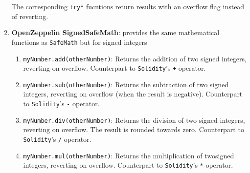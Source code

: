 \begin{enumerate}
	The corresponding \verb|try*| fucntions return results with an overflow flag instead of reverting.

\item\textbf{OpenZeppelin SignedSafeMath}: provides the same mathematical functions as \verb|SafeMath| but for signed integers
	\begin{enumerate}
	\item\verb|myNumber.add(otherNumber)|: Returns the addition of two signed integers, reverting on overflow. Counterpart to \verb|Solidity|'s \verb|+| operator.
	\item\verb|myNumber.sub(otherNumber)|: Returns the subtraction of two signed integers, reverting on overflow (when the result is negative). Counterpart to \verb|Solidity|'s \verb|-| operator.
	\item\verb|myNumber.div(otherNumber)|: Returns the division of two signed integers, reverting on overflow. The result is rounded towards zero. Counterpart to \verb|Solidity|'s \verb|/| operator.
	\item\verb|myNumber.mul(otherNumber)|: Returns the multiplication of two\linebreak signed integers, reverting on overflow. Counterpart to \verb|Solidity|'s \verb|*| operator.
	\end{enumerate}


\end{enumerate}
